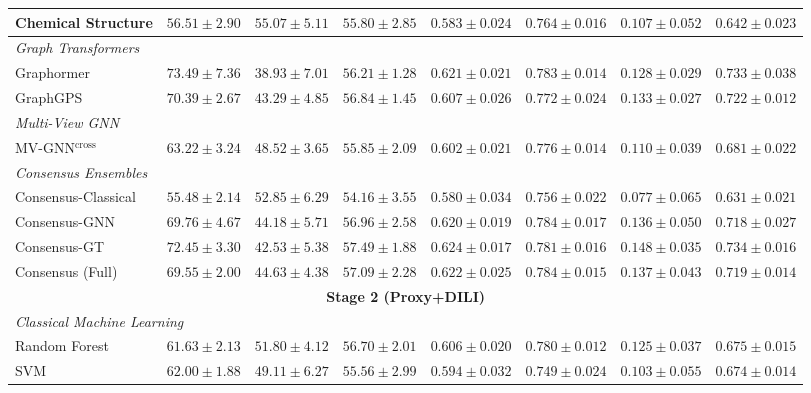 \documentclass[letterpaper]{article}
\begin{document}
\begin{table}[t]
{\begin{tabular}{lccccccc}
\midrule
Chemical Structure & $56.51 \pm 2.90$ & {\boldmath$55.07 \pm 5.11$} & $55.80 \pm 2.85$ & $0.583 \pm 0.024$ & $0.764 \pm 0.016$ & $0.107 \pm 0.052$ & $0.642 \pm 0.023$ \\
\midrule
\multicolumn{8}{l}{\textit{Graph Transformers}} \\
\midrule
Graphormer & {\boldmath$73.49 \pm 7.36$} & $38.93 \pm 7.01$ & $56.21 \pm 1.28$ & $0.621 \pm 0.021$ & \underline{$0.783 \pm 0.014$} & $0.128 \pm 0.029$ & \underline{$0.733 \pm 0.038$} \\
GraphGPS & $70.39 \pm 2.67$ & $43.29 \pm 4.85$ & $56.84 \pm 1.45$ & $0.607 \pm 0.026$ & $0.772 \pm 0.024$ & $0.133 \pm 0.027$ & $0.722 \pm 0.012$ \\
\midrule
\multicolumn{8}{l}{\textit{Multi-View GNN }} \\
\midrule
MV-GNN$^{\text{cross}}$ & $63.22 \pm 3.24$ & $48.52 \pm 3.65$ & $55.85 \pm 2.09$ & $0.602 \pm 0.021$ & $0.776 \pm 0.014$ & $0.110 \pm 0.039$ & $0.681 \pm 0.022$ \\
\midrule
\multicolumn{8}{l}{\textit{Consensus Ensembles}} \\
\midrule
Consensus-Classical & $55.48 \pm 2.14$ & $52.85 \pm 6.29$ & $54.16 \pm 3.55$ & $0.580 \pm 0.034$ & $0.756 \pm 0.022$ & $0.077 \pm 0.065$ & $0.631 \pm 0.021$ \\
Consensus-GNN & $69.76 \pm 4.67$ & $44.18 \pm 5.71$ & $56.96 \pm 2.58$ & $0.620 \pm 0.019$ & {\boldmath$0.784 \pm 0.017$} & $0.136 \pm 0.050$ & $0.718 \pm 0.027$ \\
Consensus-GT & \underline{$72.45 \pm 3.30$} & $42.53 \pm 5.38$ & $57.49 \pm 1.88$ & {\boldmath$0.624 \pm 0.017$} & $0.781 \pm 0.016$ & \underline{$0.148 \pm 0.035$} & {\boldmath$0.734 \pm 0.016$} \\
Consensus (Full) & $69.55 \pm 2.00$ & $44.63 \pm 4.38$ & $57.09 \pm 2.28$ & \underline{$0.622 \pm 0.025$} & {\boldmath$0.784 \pm 0.015$} & $0.137 \pm 0.043$ & $0.719 \pm 0.014$ \\
\midrule
\multicolumn{8}{c}{\textbf{Stage 2 (Proxy+DILI)}} \\
\midrule
\multicolumn{8}{l}{\textit{Classical Machine Learning}} \\
\midrule
Random Forest & $61.63 \pm 2.13$ & $51.80 \pm 4.12$ & $56.70 \pm 2.01$ & $0.606 \pm 0.020$ & $0.780 \pm 0.012$ & $0.125 \pm 0.037$ & $0.675 \pm 0.015$ \\
SVM & $62.00 \pm 1.88$ & $49.11 \pm 6.27$ & $55.56 \pm 2.99$ & $0.594 \pm 0.032$ & $0.749 \pm 0.024$ & $0.103 \pm 0.055$ & $0.674 \pm 0.014$ \\

\end{tabular}}
\end{table}
\end{document}
